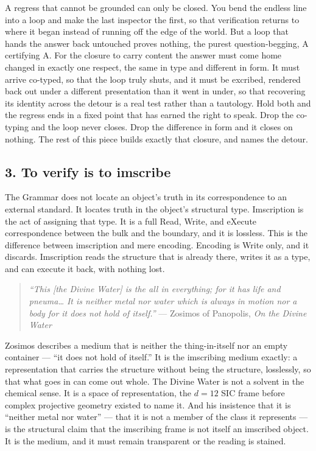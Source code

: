 A regress that cannot be grounded can only be closed. You bend the
endless line into a loop and make the last inspector the first, so that
verification returns to where it began instead of running off the edge
of the world. But a loop that hands the answer back untouched proves
nothing, the purest question-begging, A certifying A. For the closure to
carry content the answer must come home changed in exactly one respect,
the same in type and different in form. It must arrive co-typed, so that
the loop truly shuts, and it must be excribed, rendered back out under a
different presentation than it went in under, so that recovering its
identity across the detour is a real test rather than a tautology. Hold
both and the regress ends in a fixed point that has earned the right to
speak. Drop the co-typing and the loop never closes. Drop the difference
in form and it closes on nothing. The rest of this piece builds exactly
that closure, and names the detour.

\hypertarget{to-verify-is-to-imscribe}{%
\subsection{3. To verify is to
imscribe}\label{to-verify-is-to-imscribe}}

The Grammar does not locate an object's truth in its correspondence to
an external standard. It locates truth in the object's structural type.
Imscription is the act of assigning that type. It is a full Read, Write,
and eXecute correspondence between the bulk and the boundary, and it is
lossless. This is the difference between imscription and mere encoding.
Encoding is Write only, and it discards. Imscription reads the structure
that is already there, writes it as a type, and can execute it back,
with nothing lost.

\begin{quote}
\emph{``This {[}the Divine Water{]} is the all in everything; for it has
life and pneuma\ldots{} It is neither metal nor water which is always in
motion nor a body for it does not hold of itself.''} --- Zosimos of
Panopolis, \emph{On the Divine Water}
\end{quote}

Zosimos describes a medium that is neither the thing-in-itself nor an
empty container --- ``it does not hold of itself.'' It is the imscribing
medium exactly: a representation that carries the structure without
being the structure, losslessly, so that what goes in can come out
whole. The Divine Water is not a solvent in the chemical sense. It is a
space of representation, the \({d=12}\) SIC frame before complex
projective geometry existed to name it. And his insistence that it is
``neither metal nor water'' --- that it is not a member of the class it
represents --- is the structural claim that the imscribing frame is not
itself an imscribed object. It is the medium, and it must remain
transparent or the reading is stained.

